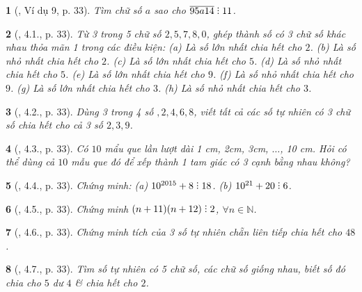 \documentclass{article}
\newtheorem{baitoan}{}
\DeclareRobustCommand{\divby}{%
	\mathrel{\vbox{\baselineskip.65ex\lineskiplimit0pt\hbox{.}\hbox{.}\hbox{.}}}%
}
\begin{document}
\begin{baitoan}[\cite{Binh_boi_duong_Toan_6_tap_1}, Ví dụ 9, p. 33]
	Tìm chữ số $a$ sao cho $\overline{95a14}\divby11$.
\end{baitoan}

\begin{baitoan}[\cite{Binh_boi_duong_Toan_6_tap_1}, 4.1., p. 33]
	Từ 3 trong 5 chữ số $2,5,7,8,0$, ghép thành số có 3 chữ số khác nhau thỏa mãn 1 trong các điều kiện: (a) Là số lớn nhất chia hết cho $2$. (b) Là số nhỏ nhất chia hết cho $2$. (c) Là số lớn nhất chia hết cho $5$. (d) Là số nhỏ nhất chia hết cho $5$. (e) Là số lớn nhất chia hết cho $9$. (f) Là số nhỏ nhất chia hết cho $9$. (g) Là số lớn nhất chia hết cho $3$. (h) Là số nhỏ nhất chia hết cho $3$.
\end{baitoan}

\begin{baitoan}[\cite{Binh_boi_duong_Toan_6_tap_1}, 4.2., p. 33]
	Dùng 3 trong 4 số $,2,4,6,8$, viết tất cả các số tự nhiên có 3 chữ số chia hết cho cả 3 số $2,3,9$.
\end{baitoan}

\begin{baitoan}[\cite{Binh_boi_duong_Toan_6_tap_1}, 4.3., p. 33]
	Có $10$ mẩu que lần lượt dài {\rm1 cm, 2cm, 3cm, $\ldots$, 10 cm}. Hỏi có thể dùng cả $10$ mẫu que đó để xếp thành 1 tam giác có 3 cạnh bằng nhau không?
\end{baitoan}

\begin{baitoan}[\cite{Binh_boi_duong_Toan_6_tap_1}, 4.4., p. 33]
	Chứng minh: (a) $10^{2015} + 8\divby18$. (b) $10^{21} + 20\divby6$.
\end{baitoan}

\begin{baitoan}[\cite{Binh_boi_duong_Toan_6_tap_1}, 4.5., p. 33]
	Chứng minh $(n + 11)(n + 12)\divby2$, $\forall n\in\mathbb{N}$.
\end{baitoan}

\begin{baitoan}[\cite{Binh_boi_duong_Toan_6_tap_1}, 4.6., p. 33]
	Chứng minh tích của 3 số tự nhiên chẵn liên tiếp chia hết cho $48$.
\end{baitoan}

\begin{baitoan}[\cite{Binh_boi_duong_Toan_6_tap_1}, 4.7., p. 33]
	Tìm số tự nhiên có 5 chữ số, các chữ số giống nhau, biết số đó chia cho $5$ dư $4$ \& chia hết cho $2$.
\end{baitoan}
\end{document}
